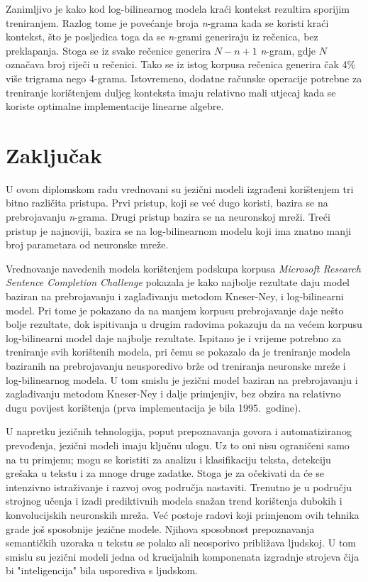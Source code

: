 \documentclass[times, utf8, diplomski, numeric]{fer}
\begin{document}
Zanimljivo je kako kod log-bilinearnog modela kraći kontekst rezultira sporijim treniranjem. Razlog tome je povećanje broja \textit{n}-grama kada se koristi kraći kontekst, što je posljedica toga da se \textit{n}-grami generiraju iz rečenica, bez preklapanja. Stoga se iz svake rečenice generira $N - n + 1$ \textit{n}-gram, gdje $N$ označava broj riječi u rečenici. Tako se iz istog korpusa rečenica generira čak 4\% više trigrama nego 4-grama. Istovremeno, dodatne računske operacije potrebne za treniranje korištenjem duljeg konteksta imaju relativno mali utjecaj kada se koriste optimalne implementacije linearne algebre.

\chapter{Zaključak}

U ovom diplomskom radu vrednovani su jezični modeli izgrađeni korištenjem tri bitno različita pristupa. Prvi pristup, koji se već dugo koristi, bazira se na prebrojavanju \textit{n}-grama. Drugi pristup bazira se na neuronskoj mreži. Treći pristup je najnoviji, bazira se na log-bilinearnom modelu koji ima znatno manji broj parametara od neuronske mreže.

Vrednovanje navedenih modela korištenjem podskupa korpusa \textit{Microsoft Research Sentence Completion Challenge} pokazala je kako najbolje rezultate daju model baziran na prebrojavanju i zaglađivanju metodom Kneser-Ney, i log-bilinearni model. Pri tome je pokazano da na manjem korpusu prebrojavanje daje nešto bolje rezultate, dok ispitivanja u drugim radovima pokazuju da na većem korpusu log-bilinearni model daje najbolje rezultate. Ispitano je i vrijeme potrebno za treniranje svih korištenih modela, pri čemu se pokazalo da je treniranje modela baziranih na prebrojavanju neusporedivo brže od treniranja neuronske mreže i log-bilinearnog modela. U tom smislu je jezični model baziran na prebrojavanju i zaglađivanju metodom Kneser-Ney i dalje primjenjiv, bez obzira na relativno dugu povijest korištenja (prva implementacija je bila 1995.\ godine).

U napretku jezičnih tehnologija, poput prepoznavanja govora i automatiziranog prevođenja, jezični modeli imaju ključnu ulogu. Uz to oni nisu ograničeni samo na tu primjenu; mogu se koristiti za analizu i klasifikaciju teksta, detekciju grešaka u tekstu i za mnoge druge zadatke. Stoga je za očekivati da će se intenzivno istraživanje i razvoj ovog područja nastaviti. Trenutno je u području strojnog učenja i izadi prediktivnih modela snažan trend korištenja dubokih i konvolucijskih neuronskih mreža. Već postoje radovi koji primjenom ovih tehnika grade još sposobnije jezične modele. Njihova sposobnost prepoznavanja semantičkih uzoraka u tekstu se polako ali neosporivo približava ljudskoj. U tom smislu su jezični modeli jedna od krucijalnih komponenata izgradnje strojeva čija bi "inteligencija" bila usporediva s ljudskom.
\end{document}
